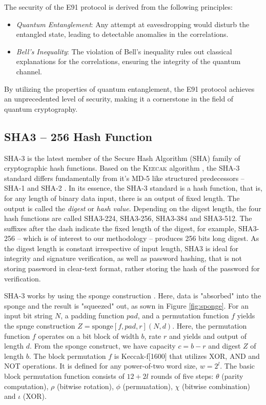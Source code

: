 \documentclass{article}
\begin{document}
The security of the E91 protocol is derived from the following principles:
\begin{itemize}
    \item \textit{Quantum Entanglement}: Any attempt at eavesdropping would disturb the entangled state, leading to detectable anomalies in the correlations.
    \item \textit{Bell's Inequality}: The violation of Bell's inequality rules out classical explanations for the correlations, ensuring the integrity of the quantum channel.
\end{itemize}

By utilizing the properties of quantum entanglement, the E91 protocol achieves an unprecedented level of security, making it a cornerstone in the field of quantum cryptography.
\subsection{SHA3 -- 256 Hash Function}
\label{sec:sha3}
SHA-3 is the latest member \cite{nistHashFunctions} of the Secure Hash Algorithm (SHA) family of cryptographic hash functions. Based on the K\textsc{eecak} algorithm \cite{Bbbbbbb2011}, the SHA-3 standard differs fundamentally from it's MD-5 \cite{rivest1992md5} like structured predecessors -- SHA-1 and SHA-2 \cite{penard2008secure}. In its essence, the SHA-3 standard is a hash function, that is, for any length of binary data input, there is an output of fixed length. The output is called the \textit{digest} or \textit{hash value}. Depending on the digest length, the four hash functions are called SHA3-224, SHA3-256, SHA3-384 and SHA3-512. The suffixes after the dash indicate the fixed length of the digest, for example, SHA3-256 -- which is of interest to our methodology -- produces 256 bits long digest. As the digest length is constant irrespective of input length, SHA3 is ideal for integrity and signature verification, as well as password hashing, that is not storing password in clear-text format, rather storing the hash of the password for verification.

SHA-3 works by using the sponge construction \cite{keccakKeccakTeam}. Here, data is "absorbed" into the sponge and the result is "squeezed" out, as sown in Figure \ref{fig:sponge}. For an input bit string $N$, a padding function $pad$, and a permutation function $f$ yields the spnge construction $Z=\text{sponge}[f,pad,r](N,d)$. Here, the permutation function $f$ operates on a bit block of width $b$, rate $r$ and yields and output of length $d$. From the sponge construct, we have capacity $c=b-r$ and digest $Z$ of length $b$. The block permutation $f$ is Keccak-f[1600] that utilizes XOR, AND and NOT operations. It is defined for any power-of-two word size, $w=2^l$. The basic block permutation function consists of $12+2l$ rounds of five steps: $\theta$ (parity computation), $\rho$ (bitwise rotation), $\phi$ (permuatation), $\chi$ (bitwise combination) and $\iota$ (XOR).
\end{document}
